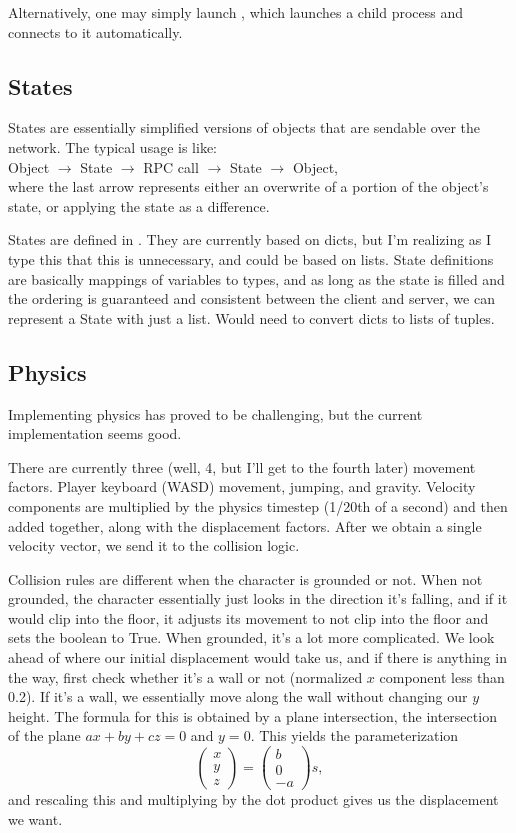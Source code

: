 \documentclass{article}
\begin{document}
Alternatively, one may simply launch , which launches a child
 process and connects to it automatically.

\subsection{States}
States are essentially simplified versions of objects that are sendable over
the network. The typical usage is like:\\
Object $\rightarrow$ State $\rightarrow$ RPC call $\rightarrow$ State
$\rightarrow$ Object,\\
where the last arrow represents either an overwrite of a portion of the object's state,
or applying the state as a difference.

States are defined in . They are currently based on dicts,
but I'm realizing as I type this that this is unnecessary, and could be based on
lists. State definitions are basically mappings of variables to types, and as long as
the state is filled and the ordering is guaranteed and consistent between the
client and server, we can represent a State with just a list. Would need to convert
dicts to lists of tuples.
\subsection{Physics}
Implementing physics has proved to be challenging, but the current implementation seems
good.

There are currently three (well, 4, but I'll get to the fourth later) movement
factors. Player keyboard (WASD) movement, jumping, and gravity. Velocity
components are multiplied by the physics timestep (1/20th of a second) and then
added together, along with the displacement factors. After we obtain a single
velocity vector, we send it to the collision logic.

Collision rules are different when the character is grounded or not.
When not grounded, the character essentially just looks in the direction it's
falling, and if it would clip into the floor, it adjusts its movement to not clip
into the floor and sets the  boolean to True.
When grounded, it's a lot more complicated. We look ahead of where our initial
displacement would take us, and if there is anything in the way, first check
whether it's a wall or not (normalized $x$ component less than 0.2). If it's a wall,
we essentially move along the wall without changing our $y$ height.
The formula for this is obtained by a plane intersection, the intersection of the
plane $ax + by + cz = 0$ and $y = 0$. This yields the parameterization
\[
\begin{pmatrix}
    x\\
    y\\
    z 
\end{pmatrix} =
\begin{pmatrix}
    b\\0\\-a
\end{pmatrix}s,\]
and rescaling this and multiplying by the dot product gives us the displacement
we want.
\end{document}
